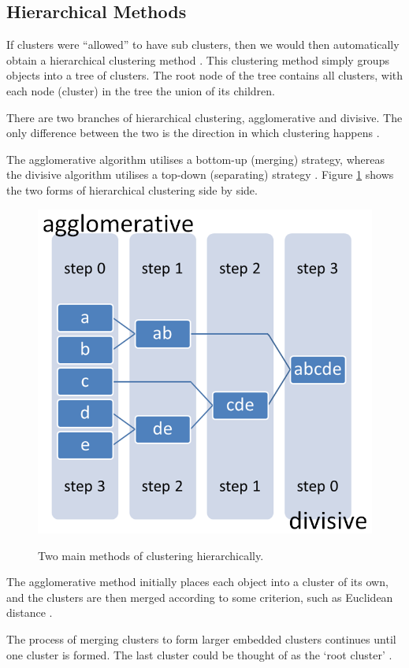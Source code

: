 \subsection{Hierarchical Methods}
If clusters were ``allowed'' to have sub clusters, then we would then 
automatically obtain a hierarchical clustering method \citep{tan05}. This 
clustering method simply groups objects into a tree of clusters. The root node 
of the tree contains all clusters, with each node (cluster) in the tree the 
union of its children.

There are two branches of hierarchical clustering, agglomerative and divisive. 
The only difference between the two is the direction in which clustering 
happens \citep{tan05}.

The agglomerative algorithm utilises a bottom-up (merging) strategy, whereas 
the divisive algorithm utilises a top-down (separating) strategy \citep{tan05}. 
Figure \ref{fig:hierarchicalDefinition} shows the two forms of hierarchical 
clustering side by side. 

\begin{figure}[H]
  \centering
  \includegraphics[width=0.7\linewidth]{chapter3/clustering/hierarchical.png}
  \label{fig:hierarchicalDefinition}
  \caption
   {Two main methods of clustering hierarchically.}
\end{figure}

The agglomerative method initially places each object into a cluster of its own, 
and the clusters are then merged according to some criterion, such as Euclidean 
distance \citep{tan05}. 

The process of merging clusters to form larger embedded clusters continues 
until one cluster is formed. The last cluster could be thought of as the `root 
cluster' \citep{han06}.

